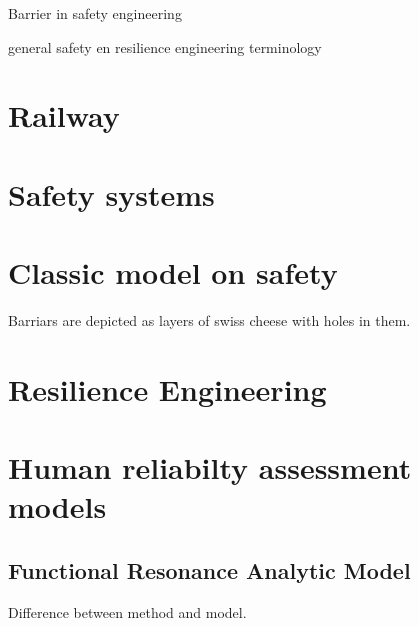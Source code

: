 Barrier in safety engineering

general safety en resilience engineering terminology

\section{Railway}

\section{Safety systems}

\section{Classic model on safety}
Barriars are depicted as layers of swiss cheese with holes in them. 

\section{Resilience Engineering}
\label{sec:resilience_engineering}

\section{Human reliabilty assessment models}



\subsection{Functional Resonance Analytic Model}

Difference between method and model.